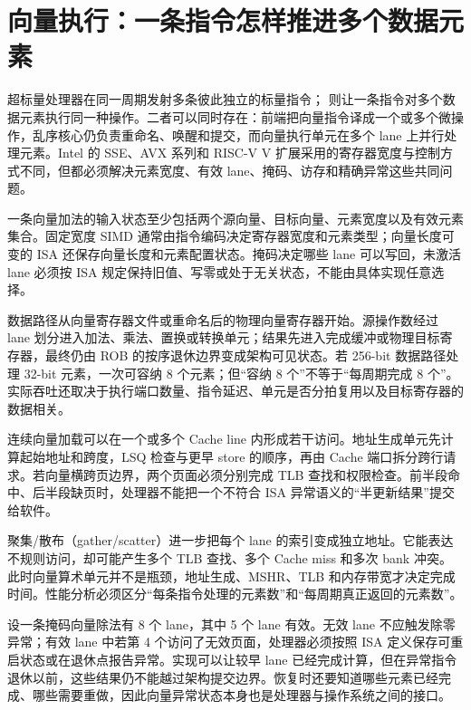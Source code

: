 \section{向量执行：一条指令怎样推进多个数据元素}

超标量处理器在同一周期发射多条彼此独立的标量指令； 则让一条指令对多个数据元素执行同一种操作。二者可以同时存在：前端把向量指令译成一个或多个微操作，乱序核心仍负责重命名、唤醒和提交，而向量执行单元在多个 lane 上并行处理元素。Intel 的 SSE、AVX 系列和 RISC-V V 扩展采用的寄存器宽度与控制方式不同，但都必须解决元素宽度、有效 lane、掩码、访存和精确异常这些共同问题。\cite{intel-sdm,riscv-vector}

一条向量加法的输入状态至少包括两个源向量、目标向量、元素宽度以及有效元素集合。固定宽度 SIMD 通常由指令编码决定寄存器宽度和元素类型；向量长度可变的 ISA 还保存向量长度和元素配置状态。掩码决定哪些 lane 可以写回，未激活 lane 必须按 ISA 规定保持旧值、写零或处于无关状态，不能由具体实现任意选择。

数据路径从向量寄存器文件或重命名后的物理向量寄存器开始。源操作数经过 lane 划分进入加法、乘法、置换或转换单元；结果先进入完成缓冲或物理目标寄存器，最终仍由 ROB 的按序退休边界变成架构可见状态。若 256-bit 数据路径处理 32-bit 元素，一次可容纳 8 个元素；但“容纳 8 个”不等于“每周期完成 8 个”。实际吞吐还取决于执行端口数量、指令延迟、单元是否分拍复用以及目标寄存器的数据相关。

连续向量加载可以在一个或多个 Cache line 内形成若干访问。地址生成单元先计算起始地址和跨度，LSQ 检查与更早 store 的顺序，再由 Cache 端口拆分跨行请求。若向量横跨页边界，两个页面必须分别完成 TLB 查找和权限检查。前半段命中、后半段缺页时，处理器不能把一个不符合 ISA 异常语义的“半更新结果”提交给软件。

聚集/散布（gather/scatter）进一步把每个 lane 的索引变成独立地址。它能表达不规则访问，却可能产生多个 TLB 查找、多个 Cache miss 和多次 bank 冲突。此时向量算术单元并不是瓶颈，地址生成、MSHR、TLB 和内存带宽才决定完成时间。性能分析必须区分“每条指令处理的元素数”和“每周期真正返回的元素数”。

设一条掩码向量除法有 8 个 lane，其中 5 个 lane 有效。无效 lane 不应触发除零异常；有效 lane 中若第 4 个访问了无效页面，处理器必须按照 ISA 定义保存可重启状态或在退休点报告异常。实现可以让较早 lane 已经完成计算，但在异常指令退休以前，这些结果仍不能越过架构提交边界。恢复时还要知道哪些元素已经完成、哪些需要重做，因此向量异常状态本身也是处理器与操作系统之间的接口。

